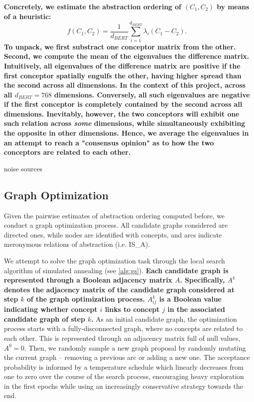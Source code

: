 \textbf{Concretely, we estimate the abstraction ordering of $(C_1, C_2)$ by means of a heuristic:$$f(C_1, C_2) = \frac{1}{d_{BERT}} \sum\limits_{i=1}^{d_{BERT}} \lambda_i(C_1 - C_2).$$ To unpack, we first substract one conceptor matrix from the other. Second, we compute the mean of the eigenvalues the difference matrix. Intuitively, all eigenvalues of the difference matrix are positive if the first conceptor spatially engulfs the other, having higher spread than the second across all dimensions. In the context of this project, across all $d_{BERT} = 768$ dimensions. Conversely, all such eigenvalues are negative if the first conceptor is completely contained by the second across all dimensions. Inevitably, however, the two conceptors will exhibit one such relation across \textit{some} dimensions, while simultaneously exhibiting the opposite in other dimensions. Hence, we average the eigenvalues in an attempt to reach a "consensus opinion" as to how the two conceptors are related to each other.}

noise sources

\subsection{Graph Optimization}

Given the pairwise estimates of abstraction ordering computed before, we conduct a graph optimization process. All candidate graphs considered are directed ones, while nodes are identified with concepts, and arcs indicate meronymous relations of abstraction (i.e. IS\_A).

We attempt to solve the graph optimization task through the local search algorithm of simulated annealing (see \ref{alg:gs}). \textbf{Each candidate graph is represented through a Boolean adjacency matrix $A$. Specifically, $A^k$ denotes the adjacency matrix of the candidate graph considered at step $k$ of the graph optimization process. $A^k_{ij}$ is a Boolean value indicating whether concept $i$ links to concept $j$ in the associated candidate graph of step $k$.} As an initial candidate graph, the optimization process starts with a fully-disconnected graph, where no concepts are related to each other. This is represented through an adjacency matrix full of null values, $A^0 = 0$. Then, we randomly sample a new graph proposal by randomly mutating the current graph -- removing a previous arc or adding a new one. The acceptance probability is informed by a temperature schedule which linearly decreases from one to zero over the course of the search process, encouraging heavy exploration in the first epochs while using an increasingly conservative strategy towards the end.

